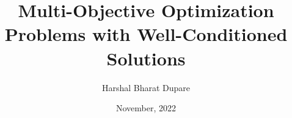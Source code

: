 \documentclass[12pt,a4paper,twoside]{iitgthesis}%
\begin{document}
\title{Multi-Objective Optimization Problems with Well-Conditioned Solutions}
\author{Harshal Bharat Dupare}
\date{November, 2022}
\maketitle





\begin{romanpages}



%



\tableofcontents
\end{romanpages}




% 
% 

% 

%




% 




\renewcommand{\bibname}{References}

\end{document}
